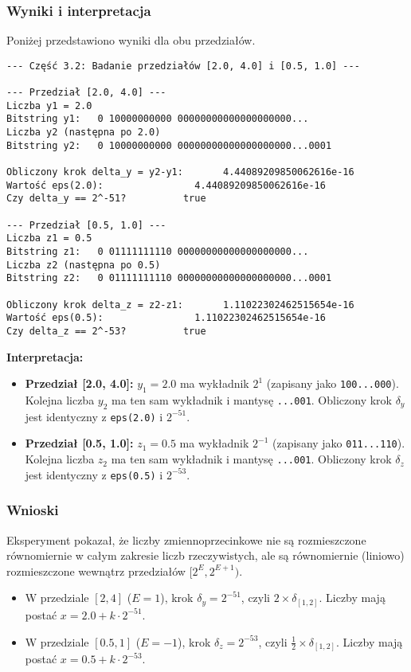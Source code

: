 \documentclass[11pt, a4paper]{article}
\begin{document}
\subsubsection{Wyniki i interpretacja}
Poniżej przedstawiono wyniki dla obu przedziałów.
\begin{verbatim}
--- Część 3.2: Badanie przedziałów [2.0, 4.0] i [0.5, 1.0] ---

--- Przedział [2.0, 4.0] ---
Liczba y1 = 2.0
Bitstring y1:   0 10000000000 00000000000000000000...
Liczba y2 (następna po 2.0)
Bitstring y2:   0 10000000000 00000000000000000000...0001

Obliczony krok delta_y = y2-y1:       4.44089209850062616e-16
Wartość eps(2.0):                4.44089209850062616e-16
Czy delta_y == 2^-51?          true

--- Przedział [0.5, 1.0] ---
Liczba z1 = 0.5
Bitstring z1:   0 01111111110 00000000000000000000...
Liczba z2 (następna po 0.5)
Bitstring z2:   0 01111111110 00000000000000000000...0001

Obliczony krok delta_z = z2-z1:       1.11022302462515654e-16
Wartość eps(0.5):                1.11022302462515654e-16
Czy delta_z == 2^-53?          true
\end{verbatim}

\noindent \textbf{Interpretacja:}
\begin{itemize}
    \item \textbf{Przedział [2.0, 4.0]:} $y_1 = 2.0$ ma wykładnik $2^1$ (zapisany jako \texttt{100...000}). Kolejna liczba $y_2$ ma ten sam wykładnik i mantysę \texttt{...001}. Obliczony krok $\delta_y$ jest identyczny z \texttt{eps(2.0)} i $2^{-51}$.
    \item \textbf{Przedział [0.5, 1.0]:} $z_1 = 0.5$ ma wykładnik $2^{-1}$ (zapisany jako \texttt{011...110}). Kolejna liczba $z_2$ ma ten sam wykładnik i mantysę \texttt{...001}. Obliczony krok $\delta_z$ jest identyczny z \texttt{eps(0.5)} i $2^{-53}$.
\end{itemize}

\subsubsection{Wnioski}
Eksperyment pokazał, że liczby zmiennoprzecinkowe  nie są  rozmieszczone równomiernie w całym zakresie liczb rzeczywistych, ale są równomiernie (liniowo) rozmieszczone wewnątrz przedziałów $[2^E, 2^{E+1})$.

\begin{itemize}
    \item W przedziale $[2, 4]$ ($E=1$), krok $\delta_y = 2^{-51}$, czyli $2 \times \delta_{[1,2]}$. Liczby mają postać $x = 2.0 + k \cdot 2^{-51}$.
    \item W przedziale $[0.5, 1]$ ($E=-1$), krok $\delta_z = 2^{-53}$, czyli $\frac{1}{2} \times \delta_{[1,2]}$. Liczby mają postać $x = 0.5 + k \cdot 2^{-53}$.
\end{itemize}
\end{document}
